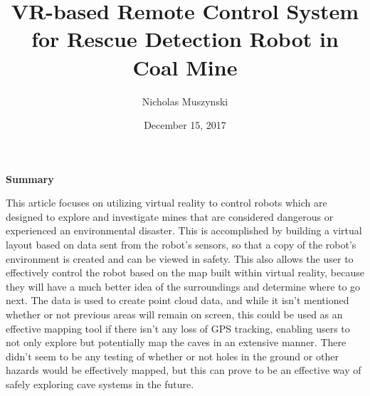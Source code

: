 \documentclass{article}
\begin{document}
\title{VR-based Remote Control System for Rescue Detection Robot in Coal Mine}
\author{Nicholas Muszynski}
\date{December 15, 2017}

\maketitle

\textbf{Summary}
\newline

This article focuses on utilizing virtual reality to control robots which are designed to explore and investigate mines that are considered dangerous or experienced an environmental disaster. This is accomplished by building a virtual layout based on data sent from the robot's sensors, so that a copy of the robot's environment is created and can be viewed in safety. This also allows the user to effectively control the robot based on the map built within virtual reality, because they will have a much better idea of the surroundings and determine where to go next. The data is used to create point cloud data, and while it isn't mentioned whether or not previous areas will remain on screen, this could be used as an effective mapping tool if there isn't any loss of GPS tracking, enabling users to not only explore but potentially map the caves in an extensive manner. There didn't seem to be any testing of whether or not holes in the ground or other hazards would be effectively mapped, but this can prove to be an effective way of safely exploring cave systems in the future.

\nocite{robotCite}



\end{document}
